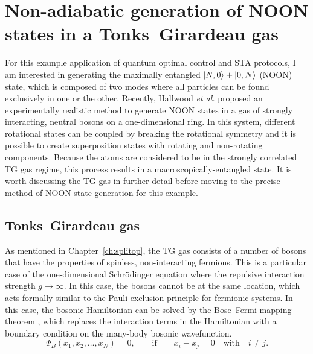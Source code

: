 \section{Non-adiabatic generation of NOON states in a Tonks--Girardeau gas}

For this example application of quantum optimal control and STA protocols, I am interested in generating the maximally entangled $\ket{N,0} + \ket{0,N}$ (NOON) state, which is composed of two modes where all particles can be found exclusively in one or the other.
Recently, Hallwood \textit{et al.} proposed an experimentally realistic method to generate NOON states in a gas of strongly interacting, neutral bosons on a one-dimensional ring.
In this system, different rotational states can be coupled by breaking the rotational symmetry and it is possible to create superposition states with rotating and non-rotating components.
Because the atoms are considered to be in the strongly correlated TG gas regime, this process results in a macroscopically-entangled state.
It is worth discussing the TG gas in further detail before moving to the precise method of NOON state generation for this example.

\subsection{Tonks--Girardeau gas}

As mentioned in Chapter~\ref{ch:splitop}, the TG gas consists of a number of bosons that have the properties of spinless, non-interacting fermions.
This is a particular case of the one-dimensional Schr\"odinger equation where the repulsive interaction strength $g\rightarrow\infty$.
In this case, the bosons cannot be at the same location, which acts formally similar to the Pauli-exclusion principle for fermionic systems.
In this case, the bosonic Hamiltonian can be solved by the Bose--Fermi mapping theorem \cite{girardeau2001ground, girardeau2001measurement}, which replaces the interaction terms in the Hamiltonian with a boundary condition on the many-body bosonic wavefunction.
\begin{equation}
\Psi_B(x_1, x_2, \ldots, x_N) = 0,\qquad \mathrm{if}\qquad x_i - x_j = 0 \quad\textrm{with}\quad i \ne j.
\end{equation}

